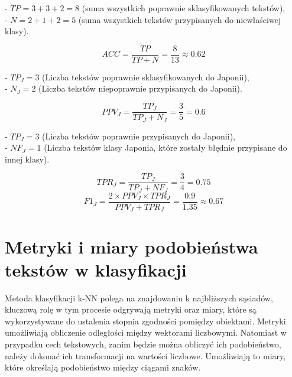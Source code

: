 \documentclass{article}
\begin{document}
\begin{flushleft}
- \(TP = 3 + 3 + 2 = 8\) (suma wszystkich poprawnie sklasyfikowanych tekstów),\\
- \(N = 2 + 1 + 2 = 5\) (suma wszystkich tekstów przypisanych do niewłaściwej klasy).

\[
    ACC = \frac{TP}{TP + N} = \frac{8}{13} \approx 0.62
\]

- \(TP_J = 3\) (Liczba tekstów poprawnie sklasyfikowanych do Japonii),\\
- \(N_J = 2\) (Liczba tekstów niepoprawnie przypisanych do Japonii).

\[
    PPV_J = \frac{TP_J}{TP_J + N_J} =\frac{3}{5} = 0.6
\]

- \(TP_J = 3\) (Liczba tekstów poprawnie przypisanych do Japonii),\\
- \(NF_J = 1\) (Liczba tekstów klasy Japonia, które zostały błędnie przypisane do innej klasy).

\[
    TPR_J = \frac{TP_J}{TP_J + NF_J} = \frac{3}{4} = 0.75
\]
\[
    F1_J = \frac{2 \times PPV_J \times TPR_J}{PPV_J + TPR_J} = \frac{0.9}{1.35} \approx 0.67
\]

\end{flushleft}




\section{Metryki i miary podobieństwa tekstów w klasyfikacji}
Metoda klasyfikacji k-NN polega na znajdowaniu k najbliższych sąsiadów, kluczową rolę w tym procesie odgrywają metryki oraz miary, które są wykorzystywane do ustalenia stopnia zgodności pomiędzy obiektami. Metryki umożliwiają obliczenie odległości między wektorami liczbowymi. Natomiast w przypadku cech tekstowych, zanim będzie można obliczyć ich podobieństwo, należy dokonać ich transformacji na wartości liczbowe. Umożliwiają to miary, które określają podobieństwo między ciągami znaków.
\end{document}
